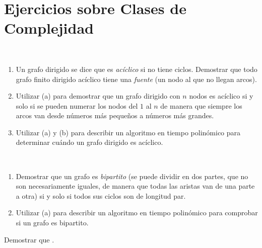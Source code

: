 \chapter{Ejercicios sobre Clases de Complejidad}

\begin{ejercicio}~
    \begin{enumerate}
        \item[(a)] Un grafo dirigido se dice que es \textit{acíclico} si no tiene ciclos. Demostrar que todo grafo finito dirigido acíclico tiene una \textit{fuente} (un nodo al que no llegan arcos).

        \item[(b)] Utilizar (a) para demostrar que un grafo dirigido con $n$ nodos es acíclico si y solo si se pueden numerar los nodos del $1$ al $n$ de manera que siempre los arcos van desde números más pequeños a números más grandes.

        \item[(c)] Utilizar (a) y (b) para describir un algoritmo en tiempo polinómico para determinar cuándo un grafo dirigido es acíclico.
    \end{enumerate}
\end{ejercicio}

\begin{ejercicio}~
    \begin{enumerate}
        \item[(a)] Demostrar que un grafo es \textit{bipartito} (se puede dividir en dos partes, que no son necesariamente iguales, de manera que todas las aristas van de una parte a otra) si y solo si todos sus ciclos son de longitud par.

        \item[(b)] Utilizar (a) para describir un algoritmo en tiempo polinómico para comprobar si un grafo es bipartito.
    \end{enumerate}
\end{ejercicio}

\begin{ejercicio}
    Demostrar que \Pol {}.
\end{ejercicio}

